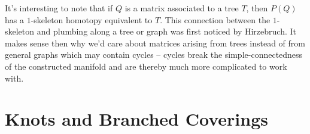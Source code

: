 It's interesting to note that if $Q$ is a matrix associated to a tree $T$, then $P(Q)$ has a $1$-skeleton homotopy equivalent to $T$. This connection between the $1$-skeleton and plumbing along a tree or graph was first noticed by Hirzebruch. It makes sense then why we'd care about matrices arising from trees instead of from general graphs which may contain cycles -- cycles break the simple-connectedness of the constructed manifold and are thereby much more complicated to work with.

\pagebreak
\section{Knots and Branched Coverings}\label{sec:brieskorn}
\cite{milnor1968hypersurfaces}
\cite{kauffman1987knots}
